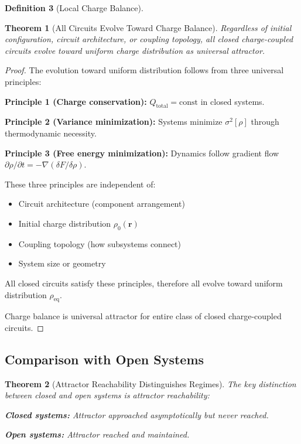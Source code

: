 \documentclass[12pt,a4paper]{article}
\theoremstyle{plain}
\newtheorem{theorem}{Theorem}[section]
\theoremstyle{definition}
\newtheorem{definition}[theorem]{Definition}
\theoremstyle{remark}
\begin{document}
\begin{definition}[Local Charge Balance]
\begin{theorem}[All Circuits Evolve Toward Charge Balance]
\label{thm:universal_evolution}
Regardless of initial configuration, circuit architecture, or coupling topology, all closed charge-coupled circuits evolve toward uniform charge distribution as universal attractor.
\end{theorem}

\begin{proof}
The evolution toward uniform distribution follows from three universal principles:

\textbf{Principle 1 (Charge conservation):} $Q_{\text{total}} = \text{const}$ in closed systems.

\textbf{Principle 2 (Variance minimization):} Systems minimize $\sigma^2[\rho]$ through thermodynamic necessity.

\textbf{Principle 3 (Free energy minimization):} Dynamics follow gradient flow $\partial \rho / \partial t = -\nabla (\delta F / \delta \rho)$.

These three principles are independent of:
\begin{itemize}
\item Circuit architecture (component arrangement)
\item Initial charge distribution $\rho_0(\mathbf{r})$
\item Coupling topology (how subsystems connect)
\item System size or geometry
\end{itemize}

All closed circuits satisfy these principles, therefore all evolve toward uniform distribution $\rho_{\text{eq}}$.

Charge balance is universal attractor for entire class of closed charge-coupled circuits.
\end{proof}

\subsection{Comparison with Open Systems}

\begin{theorem}[Attractor Reachability Distinguishes Regimes]
\label{thm:attractor_reachability}
The key distinction between closed and open systems is attractor reachability:

\textbf{Closed systems:} Attractor approached asymptotically but never reached.

\textbf{Open systems:} Attractor reached and maintained.
\end{theorem}


\end{definition}
\end{document}
